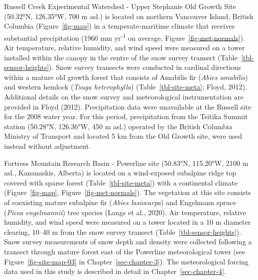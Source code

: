 \documentclass[
  letterpaper,
]{tex/uofsthesis-cs}
\begin{document}
Russell Creek Experimental Watershed - Upper Stephanie Old Growth Site
(50.32°N, 126.35°W, 700 m asl.) is located on northern Vancouver Island,
British Columbia (Figure~\ref{fig-map}) in a temperate-maritime climate
that receives substantial precipitation (1960 mm yr\textsuperscript{-1}
on average, Figure~\ref{fig-met-normals}). Air temperature, relative
humidity, and wind speed were measured on a tower installed within the
canopy in the centre of the snow survey transect
(Table~\ref{tbl-sensor-heights}). Snow survey transects were conducted
in cardinal directions within a mature old growth forest that consists
of Amabilis fir (\emph{Abies amabilis}) and western hemlock (\emph{Tsuga
heterophylla}) (Table~\ref{tbl-site-meta}; Floyd, 2012). Additional
details on the snow survey and meteorological instrumentation are
provided in Floyd (2012). Precipitation data were unavailable at the
Russell site for the 2008 water year. For this period, precipitation
from the Tsitika Summit station (50.28°N, 126.36°W, 450 m asl.) operated
by the British Columbia Ministry of Transport and located 5 km from the
Old Growth site, were used instead without adjustment.

Fortress Mountain Research Basin - Powerline site (50.83°N, 115.20°W,
2100 m asl., Kananaskis, Alberta) is located on a wind-exposed subalpine
ridge top covered with sparse forest (Table~\ref{tbl-site-meta}) with a
continental climate (Figure~\ref{fig-map},
Figure~\ref{fig-met-normals}). The vegetation at this site consists of
coexisting mature subalpine fir (\emph{Abies lasiocarpa}) and Engelmann
spruce (\emph{Picea engelmannii}) tree species (Langs et al., 2020). Air
temperature, relative humidity, and wind speed were measured on a tower
located in a 10 m diameter clearing, 10--40 m from the snow survey
transect (Table~\ref{tbl-sensor-heights}). Snow survey measurements of
snow depth and density were collected following a transect through
mature forest east of the Powerline meteorological tower (see
Figure~\ref{fig-site-map-03} in Chapter~\ref{sec-chapter-3}). The
meteorological forcing data used in this study is described in detail in
Chapter~\ref{sec-chapter-4}.
\end{document}
